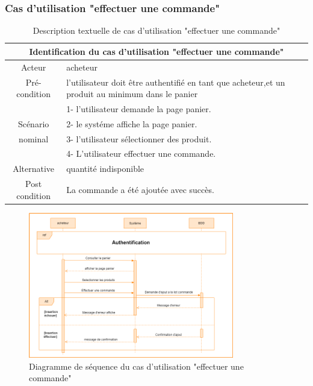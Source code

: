 \documentclass[edit,12pt,a4paper,ChapStyle,oneside,doubleinterligne]{report}
\begin{document}
\clearpage
\subsubsection{Cas d'utilisation "effectuer une commande"}
\begin{table}[h!]
    \centering
    \begin{tabular}{|c|m{10cm}|}
        \hline
        \multicolumn{2}{|c|}{Identification du cas d'utilisation "effectuer une commande"}\\
        \hline
        Acteur & acheteur\\
        \hline
        Pré-condition &l'utilisateur doit être authentifié en tant que acheteur,et un produit au minimum dans le panier \\ 
        \hline
         & 1- l'utilisateur demande la page panier.\\
         Scénario& 2- le systéme affiche la page panier.\\
         nominal& 3- l'utilisateur sélectionner des produit.\\
         & 4- L'utilisateur effectuer une commande.\\
        \hline
        Alternative  &quantité indisponible\\
        \hline
        Post condition& La commande a été ajoutée avec succès. \\
        \hline
    \end{tabular}
    \caption{Description textuelle de cas d'utilisation "effectuer une commande" }
    \label{tab:cas 8}
\end{table}
\begin{figure}[h!]\label{fig:Diagramme cas 8}
\centering
\includegraphics[width=0.8\textwidth]{images/Effectuer une commande.png}
\caption{Diagramme de séquence du cas d'utilisation "effectuer une commande"}
\end{figure}
\end{document}
